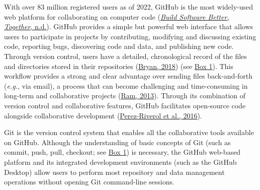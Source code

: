 With over 83 million registered users as of 2022, GitHub is the most widely-used web platform for collaborating on computer code (\protect\hyperlink{ref-nwCtHDCn}{\emph{Build Software Better, Together}, n.d.}).
GitHub provides a simple but powerful web interface that allows users to participate in projects by contributing, modifying and discussing existing code, reporting bugs, discovering code and data, and publishing new code.
Through version control, users have a detailed, chronological record of the files and directories stored in their repositories (\protect\hyperlink{ref-RVetqmsg}{Bryan, 2018}) (see \protect\hyperlink{definitions}{Box 1}).
This workflow provides a strong and clear advantage over sending files back-and-forth (\emph{e.g.}, via email), a process that can become challenging and time-consuming in long-term and collaborative projects (\protect\hyperlink{ref-4ny1onB0}{Ram, 2013}).
Through its combination of version control and collaborative features, GitHub facilitates open-source code alongside collaborative development (\protect\hyperlink{ref-kEX5dgzK}{Perez-Riverol et al., 2016}).

Git is the version control system that enables all the collaborative tools available on GitHub.
Although the understanding of basic concepts of Git (such as commit, push, pull, checkout; see \protect\hyperlink{definitions}{Box 1}) is necessary, the GitHub web-based platform and its integrated development environments (such as the GitHub Desktop) allow users to perform most repository and data management operations without opening Git command-line sessions.

